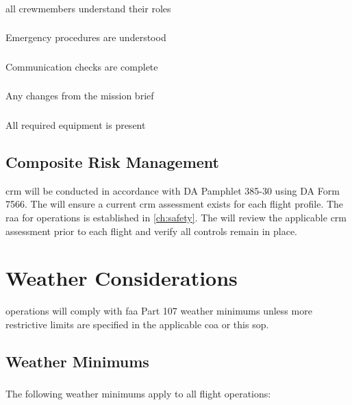         \subsubsection{} all crewmembers understand their roles
        \subsubsection{} Emergency procedures are understood
        \subsubsection{} Communication checks are complete
        \subsubsection{} Any changes from the mission brief
        \subsubsection{} All required equipment is present

    \subsection{Composite Risk Management}\label{ssec:crm}
    
    \ac{crm} will be conducted in accordance with DA Pamphlet 385-30 using DA Form 7566. The  will ensure a current \ac{crm} assessment exists for each flight profile. The \ac{raa} for \projectmars{} operations is established in \cref{ch:safety}. The  will review the applicable \ac{crm} assessment prior to each flight and verify all controls remain in place.

\section{Weather Considerations}\label{sec:weather}

\projectmars{} operations will comply with \ac{faa} Part 107 weather minimums unless more restrictive limits are specified in the applicable \ac{coa} or this \ac{sop}.

    \subsection{Weather Minimums}\label{ssec:weathermins}

        \subsubsection{} The following weather minimums apply to all \projectmars{} flight operations:

